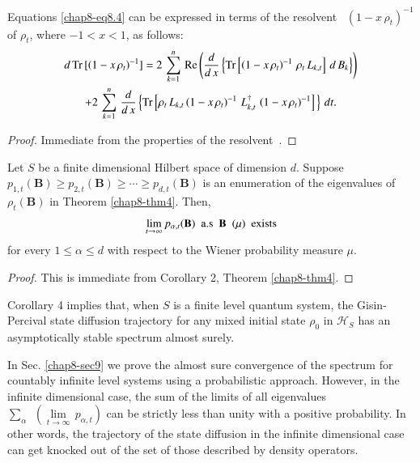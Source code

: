 \begin{coro} %
Equations \eqref{chap8-eq8.4} can be expressed in terms of the resolvent~\cite{chap8-key44} $\left(1-x\, \rho_t\right)^{-1}$ of $\rho_t$, where $-1 < x < 1$, as follows: 
\begin{multline}
d\, {\rm Tr}\,[\left(1-x\, \rho_t\right)^{-1}]= 2\, \sum_{k=1}^{n}\, {\rm Re}\left(\frac{d}{d\,x}\left\{{\rm Tr}\left[\left(1-x\, \rho_t\right)^{-1}\, \rho_t\, L_{k,t}\right]\, d\, B_{k}\right\}\right) \\ 
+2\, \sum_{k=1}^{n}\, \frac{d}{d\,x}\left\{{\rm Tr}\left[ \rho_t\, L_{k,t}\left(1-x\, \rho_t\right)^{-1}\, L_{k,t}^\dag\, \left(1-x\, \rho_t\right)^{-1}  \right]\, \right\}\, dt. \label{chap8-eq8.9}
\end{multline}
\end{coro}
     
\begin{proof}
Immediate from the properties of the resolvent~\cite{chap8-key44}.
\end{proof}
\begin{coro} %
Let $S$ be a finite dimensional Hilbert space of dimension $d$.  Suppose $p_{1,t}(\mathbf{B})\geq p_{2,t}(\mathbf{B})\geq \cdots \geq p_{d,t}(\mathbf{B})$ is an enumeration of the eigenvalues of $\rho_t(\mathbf{B})$ in Theorem \ref{chap8-thm4}. Then, 
$$
\underset{t\rightarrow\infty}{\lim}\, p_{\alpha,t}(\mathbf{B})\ \ {\rm a.s}\ \ \mathbf{B}\ \ (\mu)\ \ {\rm exists}
$$ 
for every $1\leq \alpha\leq d$ with respect to the Wiener probability measure $\mu$. 
\end{coro}
\begin{proof}
This is immediate from Corollary 2, Theorem \ref{chap8-thm4}.
\end{proof}

\begin{remark}
Corollary 4 implies that, when $S$ is a finite level quantum system, the Gisin-Percival state diffusion trajectory for any mixed initial state $\rho_0$ in $\mathcal{H}_S$ has an asymptotically stable spectrum  almost surely. 
\end{remark}

In Sec. \ref{chap8-sec9} we prove the almost sure convergence of the spectrum for countably infinite level systems using a probabilistic approach. However, in the infinite dimensional case, the sum of the limits of all eigenvalues ${\displaystyle\sum_{\alpha}}\ \ \left(\underset{t\rightarrow\infty}{\lim}\,  p_{\alpha,t}\right)$ can be strictly less than unity with a positive probability. In other words, the trajectory of the state diffusion in the infinite dimensional case can get knocked out of the set of  those described by  density operators. 

